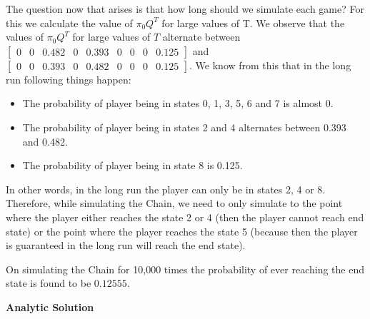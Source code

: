 \documentclass{article}
\begin{document}
\begin{enumerate}
	    \noindent %
        The question now that arises is that how long should we simulate each game? For this we calculate the value of $\pi_{0}Q^{T}$ for
        large values of T. We observe that the values of $\pi_{0}Q^{T}$ for large values of $T$ alternate between $\begin{bmatrix} 0 & 0 & 0.482 & 0 & 0.393 & 0 & 0 &
        0 & 0.125 \end{bmatrix}$ and \\ $\begin{bmatrix} 0 & 0 & 0.393 & 0 & 0.482 & 0 & 0 & 0 & 0.125 \end{bmatrix}$. We know 
        from this that in the long run following things happen:
        \begin{itemize}
            \item The probability of player being in states 0, 1, 3, 5, 6 and 7 is almost 0.
            \item The probability of player being in states 2 and 4 alternates between 0.393 and 0.482.
            \item The probability of player being in state 8 is 0.125.
        \end{itemize}
        In other words, in the long run the player can only be in states 2, 4 or 8. Therefore, while simulating the Chain, we need to 
        only simulate to the point where the player either reaches the state 2 or 4 (then the player cannot reach end state) or the 
        point where the player reaches the state 5 (because then the player is guaranteed in the long run will reach the end state). \par
	
	    \noindent %
        On simulating the Chain for 10,000 times the probability of ever reaching the end state is found to be $0.12555$.

        \textbf{Analytic Solution} \par
	

\end{enumerate}
\end{document}
